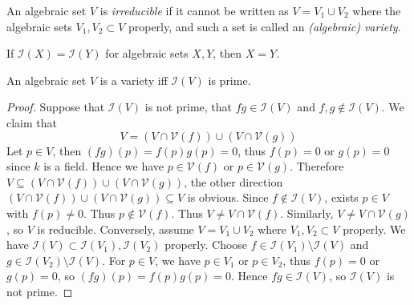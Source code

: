 \documentclass[11pt]{book}
\begin{document}
\begin{definitionbox}An algebraic set $V$ is \textit{irreducible} if it cannot be written as $V=V_1\cup V_2$ where the algebraic sets $V_1,V_2\subset V$ properly, and such a set is called an \textit{(algebraic) variety}.
\end{definitionbox}
\begin{exercise}If $\mathcal{I}(X)=\mathcal{I}(Y)$ for algebraic sets $X,Y$, then $X=Y$.
\end{exercise}
\begin{lemma}An algebraic set $V$ is a variety iff $\mathcal{I}(V)$ is prime.
\begin{proof}Suppose that $\mathcal{I}(V)$ is not prime, that $fg\in \mathcal{I}(V)$ and $f,g\not\in \mathcal{I}(V)$. We claim that 
\[V=(V\cap \mathcal{V}(f))\cup (V\cap \mathcal{V}(g))\]
Let $p\in V$, then $(fg)(p)=f(p)g(p)=0$, thus $f(p)=0$ or $g(p)=0$ since $k$ is a field. Hence we have $p\in \mathcal{V}(f)$ or $p\in \mathcal{V}(g)$. Therefore $V\subseteq (V\cap \mathcal{V}(f))\cup (V\cap \mathcal{V}(g))$, the other direction $(V\cap \mathcal{V}(f))\cup (V\cap \mathcal{V}(g))\subseteq V$ is obvious. Since $f\not\in \mathcal{I}(V)$, exists $p\in V$ with $f(p)\ne 0$. Thus $p\not\in \mathcal{V}(f)$. Thus $V\ne V\cap \mathcal{V}(f)$. Similarly, $V\ne V\cap \mathcal{V}(g)$, so $V$ is reducible. Conversely, assume $V=V_1\cup V_2$ where $V_1,V_2\subset V$ properly. We have $\mathcal{I}(V)\subset \mathcal{I}(V_1),\mathcal{I}(V_2)$ properly. Choose $f\in \mathcal{I}(V_1)\setminus \mathcal{I}(V)$ and $g\in \mathcal{I}(V_2)\setminus \mathcal{I}(V)$. For $p\in V$, we have $p\in V_1$ or $p\in V_2$, thus $f(p)=0$ or $g(p)=0$, so $(fg)(p)=f(p)g(p)=0$. Hence $fg\in \mathcal{I}(V)$, so $\mathcal{I}(V)$ is not prime.
\end{proof}
\end{lemma}
\end{document}
